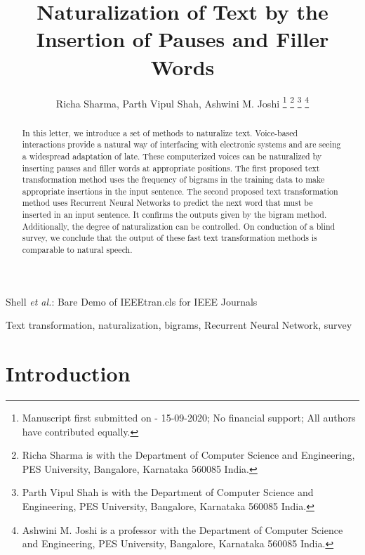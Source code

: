 \documentclass[journal]{IEEEtran}
\begin{document}
\title{Naturalization of Text by the Insertion of Pauses and Filler Words}

\author{Richa Sharma, Parth Vipul Shah, Ashwini M. Joshi 
\thanks{Manuscript first submitted on - 15-09-2020; No financial support; All authors have contributed equally.}
\thanks{Richa Sharma is with the Department of Computer Science and Engineering, PES University, Bangalore, Karnataka 560085 India.}
\thanks{Parth Vipul Shah is with the Department of Computer Science and Engineering, PES University, Bangalore, Karnataka 560085 India.}
\thanks{Ashwini M. Joshi is a professor with the Department of Computer Science and Engineering, PES University, Bangalore, Karnataka 560085 India.}
}

{Shell \MakeLowercase{\textit{et al.}}: Bare Demo of IEEEtran.cls for IEEE Journals}
\maketitle

\begin{abstract}
In this letter, we introduce a set of methods to naturalize text. Voice-based interactions provide a natural way of interfacing with electronic systems and are seeing a widespread adaptation of late. These computerized voices can be naturalized by inserting pauses and filler words at appropriate positions. The first proposed text transformation method uses the frequency of bigrams in the training data to make appropriate insertions in the input sentence. The second proposed text transformation method uses Recurrent Neural Networks to predict the next word that must be inserted in an input sentence. It confirms the outputs given by the bigram method. Additionally, the degree of naturalization can be controlled. On conduction of a blind survey, we conclude that the output of these fast text transformation methods is comparable to natural speech.
\end{abstract}

\begin{IEEEkeywords}
Text transformation, naturalization, bigrams, Recurrent Neural Network, survey
\end{IEEEkeywords}

\IEEEpeerreviewmaketitle

\section{Introduction}
\end{document}

